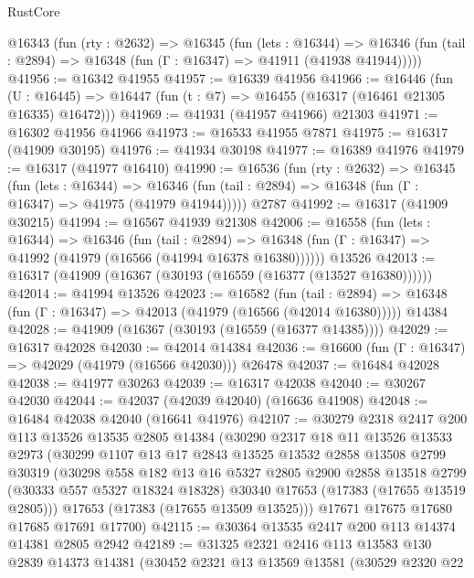 \begin{lexlean}{RustCore}
\begin{coremodule}
  @16343
    (fun (rty : @2632) =>
    @16345
      (fun (lets : @16344) =>
      @16346 (fun (tail : @2894) => @16348 (fun (Γ : @16347) => @41911 (@41938 @41944)))))
@41956 := @16342 @41955
@41957 := @16339 @41956
@41966 := @16446
    (fun (U : @16445) => @16447 (fun (t : @7) => @16455 (@16317 (@16461 @21305 @16335) @16472)))
@41969 := @41931 (@41957 @41966) @21303
@41971 := @16302 @41956 @41966
@41973 := @16533 @41955 @7871
@41975 := @16317 (@41909 @30195)
@41976 := @41934 @30198
@41977 := @16389 @41976
@41979 := @16317 (@41977 @16410)
@41990 := @16536
    (fun (rty : @2632) =>
    @16345
      (fun (lets : @16344) =>
      @16346 (fun (tail : @2894) => @16348 (fun (Γ : @16347) => @41975 (@41979 @41944)))))
    @2787
@41992 := @16317 (@41909 @30215)
@41994 := @16567 @41939 @21308
@42006 := @16558
    (fun (lets : @16344) =>
    @16346
      (fun (tail : @2894) =>
      @16348 (fun (Γ : @16347) => @41992 (@41979 (@16566 (@41994 @16378 @16380))))))
    @13526
@42013 := @16317 (@41909 (@16367 (@30193 (@16559 (@16377 (@13527 @16380))))))
@42014 := @41994 @13526
@42023 := @16582
    (fun (tail : @2894) => @16348 (fun (Γ : @16347) => @42013 (@41979 (@16566 (@42014 @16380)))))
    @14384
@42028 := @41909 (@16367 (@30193 (@16559 (@16377 @14385))))
@42029 := @16317 @42028
@42030 := @42014 @14384
@42036 := @16600 (fun (Γ : @16347) => @42029 (@41979 (@16566 @42030))) @26478
@42037 := @16484 @42028
@42038 := @41977 @30263
@42039 := @16317 @42038
@42040 := @30267 @42030
@42044 := @42037 (@42039 @42040) (@16636 @41908)
@42048 := @16484 @42038 @42040 (@16641 @41976)
@42107 := @30279
    @2318
    @2417
    @200
    @113
    @13526
    @13535
    @2805
    @14384
    (@30290
      @2317
      @18
      @11
      @13526
      @13533
      @2973
      (@30299
        @1107
        @13
        @17
        @2843
        @13525
        @13532
        @2858
        @13508
        @2799
        @30319
        (@30298
          @558
          @182
          @13
          @16
          @5327
          @2805
          @2900
          @2858
          @13518
          @2799
          (@30333 @557 @5327 @18324 @18328)
          @30340
          @17653
          (@17383 (@17655 @13519 @2805)))
        @17653
        (@17383 (@17655 @13509 @13525)))
      @17671
      @17675
      @17680
      @17685
      @17691
      @17700)
@42115 := @30364 @13535 @2417 @200 @113 @14374 @14381 @2805 @2942
@42189 := @31325
    @2321
    @2416
    @113
    @13583
    @130
    @2839
    @14373
    @14381
    (@30452
      @2321
      @13
      @13569
      @13581
      (@30529
        @2320
        @22

\end{coremodule}
\end{lexlean}

